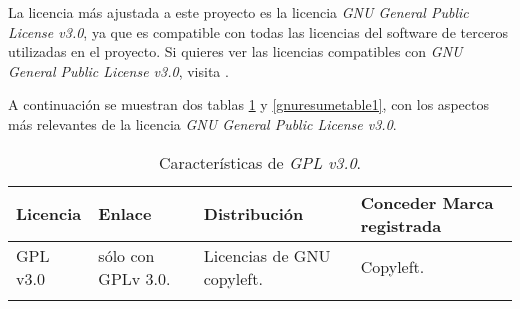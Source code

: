 La licencia más ajustada a este proyecto es la licencia \textit{GNU General Public License v3.0}, ya que es compatible con todas las licencias del software de terceros utilizadas en el proyecto. 
Si quieres ver las licencias compatibles con \textit{GNU General Public License v3.0}, visita \cite{gnulicensecomp}.

A continuación se muestran dos tablas \ref{gnuresumetable} y \ref{gnuresumetable1}, con los aspectos más relevantes de la licencia \textit{GNU General Public License v3.0}.

\begin{longtable}[]{@{}llll@{}} 
\toprule 
\begin{minipage}[b]{0.11\columnwidth}\raggedright\strut
Licencia\strut
\end{minipage} & \begin{minipage}[b]{0.15\columnwidth}\raggedright\strut
Enlace\strut
\end{minipage} & \begin{minipage}[b]{0.20\columnwidth}\raggedright\strut
Distribución\strut
\end{minipage} & \begin{minipage}[b]{0.40\columnwidth}\raggedright\strut
Conceder Marca registrada\strut
\end{minipage}\tabularnewline
\midrule
\endhead
\begin{minipage}[t]{0.15\columnwidth}\raggedright\strut
GPL v3.0\strut
\end{minipage} & \begin{minipage}[t]{0.15\columnwidth}\raggedright\strut
sólo con GPLv 3.0.\strut
\end{minipage} & \begin{minipage}[t]{0.20\columnwidth}\raggedright\strut
Licencias de GNU copyleft.\strut
\end{minipage} & \begin{minipage}[t]{0.40\columnwidth}\raggedright\strut
Copyleft.\strut
\end{minipage}\tabularnewline
\bottomrule
\caption{Características de \textit{GPL v3.0}.}
\label{gnuresumetable}
\end{longtable}


